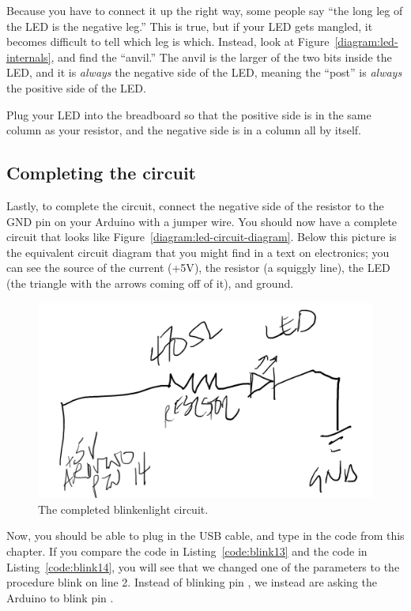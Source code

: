 Because you have to connect it up the right way, some people say ``the long leg of the LED is the negative leg.'' This is true, but if your LED gets mangled, it becomes difficult to tell which leg is which. Instead, look at Figure~\vref{diagram:led-internals}, and find the ``anvil.'' The anvil is the larger of the two bits inside the LED, and it is {\em always} the negative side of the LED, meaning the ``post'' is {\em always} the positive side of the LED.

Plug your LED into the breadboard so that the positive side is in the same column as your resistor, and the negative side is in a column all by itself.

\subsection{Completing the circuit}
Lastly, to complete the circuit, connect the negative side of the resistor to the {\code GND} pin on your Arduino with a jumper wire. You should now have a complete circuit that looks like Figure~\vref{diagram:led-circuit-diagram}. Below this picture is the equivalent circuit diagram that you might find in a text on electronics; you can see the source of the current ({\code +5V}), the resistor (a squiggly line), the LED (the triangle with the arrows coming off of it), and ground. 

\begin{figure}[ht]
  \begin{center}
    \includegraphics[width=0.8\linewidth]{images/led-circuit-diagram}
    \caption{The completed blinkenlight circuit.}
    \label{diagram:led-circuit-diagram}
  \end{center}
\end{figure}

Now, you should be able to plug in the USB cable, and type in the code from this chapter. If you compare the code in Listing~\vref{code:blink13} and the code in Listing~\vref{code:blink14}, you will see that we changed  one of the parameters to the procedure {\procname blink} on line 2. Instead of blinking pin {}, we instead are asking the Arduino to blink pin {}.

